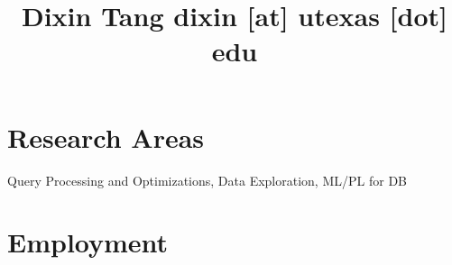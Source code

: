 \documentclass[10pt]{article} %
\begin{document}

\title{Dixin Tang {\small dixin [at] utexas [dot] edu}} %
\vspace{-5mm}

\begin{comment}
\parbox{0.5\textwidth}{ %
\begin{tabbing} %
\hspace{2.5cm} \= \hspace{4cm} \= \kill %
Postdoctoral Scholar \\
University of California, Berkeley \\
387 Soda Hall, Berkeley, CA 94720
\end{tabbing}}
\hfill %
\parbox{0.5\textwidth}{ %
\begin{tabbing} %
\hspace{2.5cm} \= \hspace{4cm} \= \kill %
(+1) 510-365-9300 \\
totemtang@berkeley.edu \\
\url{https://people.eecs.berkeley.edu/~totemtang/}
\end{tabbing}}
\vspace{-5mm}
\end{comment}


\section{Research Areas}

Query Processing and Optimizations, Data Exploration, ML/PL for DB 

\vspace{-5mm}

\section{Employment}
\end{document}
